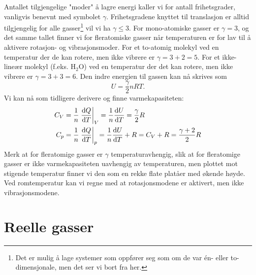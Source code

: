 Antallet tilgjengelige "moder" å lagre energi kaller vi for antall frihetsgrader, vanligvis benevnt med symbolet $\gamma$. Frihetsgradene knyttet til translasjon er alltid tilgjengelig for alle gasser\footnote{Det er mulig å lage systemer som oppfører seg som om de var \'en- eller to-dimensjonale, men det ser vi bort fra her.} vil vi ha $\gamma\leq3$. For mono-atomiske gasser er $\gamma = 3$, og det samme tallet finner vi for fleratomiske gasser når temperaturen er for lav til å aktivere rotasjon- og vibrasjonsmoder. For et to-atomig molekyl ved en temperatur der de kan rotere, men ikke vibrere er $\gamma = 3+ 2 = 5$. For et ikke-lineær molekyl (f.eks. H$_2$O) ved en temperatur der det kan rotere, men ikke vibrere er $\gamma = 3+3 = 6$. Den indre energien til gassen kan nå skrives som 
\begin{displaymath}
	U = \frac{\gamma}{2}nRT.
\end{displaymath}
Vi kan nå som tidligere derivere og finne varmekapasiteten:
\begin{displaymath}
\begin{aligned}
	C_V &= \frac{1}{n}\left.\frac{\text{d} Q}{\text{d} T}\right|_V = \frac{1}{n} \frac{\text{d} U}{\text{d} T} = \frac{\gamma}{2}R \\
	C_p &= \frac{1}{n}\left.\frac{\text{d} Q}{\text{d} T}\right|_p = \frac{1}{n} \frac{\text{d} U}{\text{d} T} + R = C_V + R = \frac{\gamma+2}{2}R
\end{aligned}
\end{displaymath}
Merk at for fleratomige gasser er $\gamma$ temperaturavhengig, slik at for fleratomige gasser er ikke varmekapasiteten uavhengig av temperaturen, men plottet mot stigende temperatur finner vi den som en rekke flate platåer med økende høyde. Ved romtemperatur kan vi regne med at rotasjonsmodene er aktivert, men ikke vibrasjonsmodene. 

\section{Reelle gasser}
\label{sec:kinetiskgassteori:reellgass}
